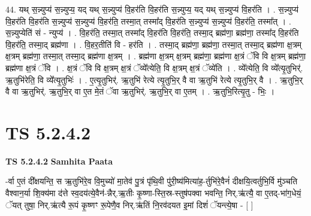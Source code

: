 \documentclass[17pt]{extarticle}
\begin{document}
44. यथ् स॒न्न्युप्य॑ स॒न्न्युप्य॒ यद् यथ् स॒न्न्युप्य॑ वि॒हर॑ति वि॒हर॑ति स॒न्न्युप्य॒ यद् यथ् स॒न्न्युप्य॑ वि॒हर॑ति । . स॒न्न्युप्य॑ वि॒हर॑ति वि॒हर॑ति स॒न्न्युप्य॑ स॒न्न्युप्य॑ वि॒हर॑ति॒ तस्मा॒त् तस्मा᳚द् वि॒हर॑ति स॒न्न्युप्य॑ स॒न्न्युप्य॑ वि॒हर॑ति॒ तस्मा᳚त् । . स॒न्न्युप्येति॑ सं - न्युप्य॑ । . वि॒हर॑ति॒ तस्मा॒त् तस्मा᳚द् वि॒हर॑ति वि॒हर॑ति॒ तस्मा॒द् ब्रह्म॑णा॒ ब्रह्म॑णा॒ तस्मा᳚द् वि॒हर॑ति वि॒हर॑ति॒ तस्मा॒द् ब्रह्म॑णा । . वि॒हर॒तीति॑ वि - हर॑ति । . तस्मा॒द् ब्रह्म॑णा॒ ब्रह्म॑णा॒ तस्मा॒त् तस्मा॒द् ब्रह्म॑णा क्ष॒त्रम् क्ष॒त्रम् ब्रह्म॑णा॒ तस्मा॒त् तस्मा॒द् ब्रह्म॑णा क्ष॒त्रम् । . ब्रह्म॑णा क्ष॒त्रम् क्ष॒त्रम् ब्रह्म॑णा॒ ब्रह्म॑णा क्ष॒त्रं ॅवि वि क्ष॒त्रम् ब्रह्म॑णा॒ ब्रह्म॑णा क्ष॒त्रं ॅवि । . क्ष॒त्रं ॅवि वि क्ष॒त्रम् क्ष॒त्रं ॅव्ये᳚त्येति॒ वि क्ष॒त्रम् क्ष॒त्रं ॅव्ये॑ति । . व्ये᳚त्येति॒ वि व्ये᳚त्यृ॒तुभिर्॑. ऋ॒तुभि॑रेति॒ वि व्ये᳚त्यृ॒तुभिः॑ । . ए॒त्यृ॒तुभिर्॑. ऋ॒तुभि॑ रेत्ये त्यृ॒तुभि॒र् वै वा ऋ॒तुभि॑ रेत्ये त्यृ॒तुभि॒र् वै । . ऋ॒तुभि॒र् वै वा ऋ॒तुभिर्॑. ऋ॒तुभि॒र् वा ए॒त मे॒तं ॅवा ऋ॒तुभिर्॑. ऋ॒तुभि॒र् वा ए॒तम् । . ऋ॒तुभि॒रित्यृ॒तु - भिः॒ । \newline
\pagebreak
{}

\section{ TS 5.2.4.2 }

\textbf{TS 5.2.4.2 } \newline
\textbf{Samhita Paata} \newline

-र्वा ए॒तं दी᳚क्षयन्ति॒ स ऋ॒तुभि॑रे॒व वि॒मुच्यो॑ मा॒तेव॑ पु॒त्रं पृ॑थि॒वी पु॑री॒ष्य॑मित्या॑ह॒-र्तुभि॑रे॒वैनं॑ दीक्षयि॒त्वर्तुभि॒र्वि मु॑ञ्चति वैश्वान॒र्या शि॒क्य॑मा द॑त्ते स्व॒दय॑त्ये॒वैन॑-न्नैर्.ऋ॒तीः कृ॒ष्णा-स्ति॒स्र-स्तुष॑पक्वा भवन्ति॒ निर्.ऋ॑त्यै॒ वा ए॒तद्-भा॑ग॒धेयं॒ ॅयत् तुषा॒ निर्.ऋ॑त्यै रू॒पं कृ॒ष्णꣳ रू॒पेणै॒व निर्.ऋ॑तिं नि॒रव॑दयत इ॒मां दिशं॑ ॅयन्त्ये॒षा - [  ] \newline
\end{document}
